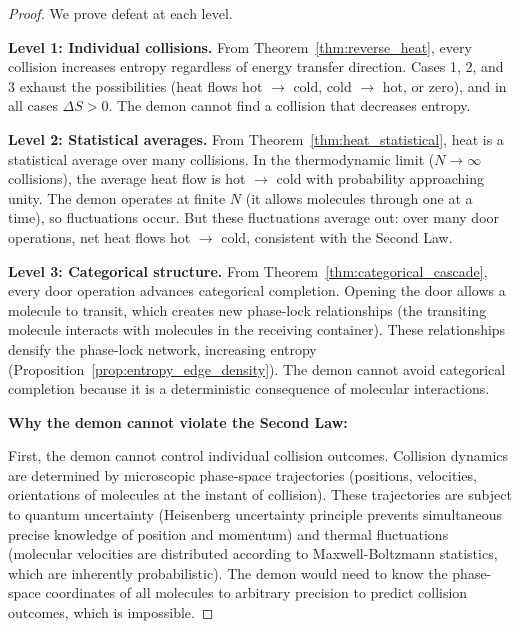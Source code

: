 \documentclass[12pt,a4paper]{article}
\theoremstyle{definition}
\theoremstyle{remark}
\begin{document}
\begin{proof}
We prove defeat at each level.

\textbf{Level 1: Individual collisions.}
From Theorem~\ref{thm:reverse_heat}, every collision increases entropy regardless of energy transfer direction. Cases 1, 2, and 3 exhaust the possibilities (heat flows hot $\to$ cold, cold $\to$ hot, or zero), and in all cases $\Delta S > 0$. The demon cannot find a collision that decreases entropy.

\textbf{Level 2: Statistical averages.}
From Theorem~\ref{thm:heat_statistical}, heat is a statistical average over many collisions. In the thermodynamic limit ($N \to \infty$ collisions), the average heat flow is hot $\to$ cold with probability approaching unity. The demon operates at finite $N$ (it allows molecules through one at a time), so fluctuations occur. But these fluctuations average out: over many door operations, net heat flows hot $\to$ cold, consistent with the Second Law.

\textbf{Level 3: Categorical structure.}
From Theorem~\ref{thm:categorical_cascade}, every door operation advances categorical completion. Opening the door allows a molecule to transit, which creates new phase-lock relationships (the transiting molecule interacts with molecules in the receiving container). These relationships densify the phase-lock network, increasing entropy (Proposition~\ref{prop:entropy_edge_density}). The demon cannot avoid categorical completion because it is a deterministic consequence of molecular interactions.

\textbf{Why the demon cannot violate the Second Law:}

First, the demon cannot control individual collision outcomes. Collision dynamics are determined by microscopic phase-space trajectories (positions, velocities, orientations of molecules at the instant of collision). These trajectories are subject to quantum uncertainty (Heisenberg uncertainty principle prevents simultaneous precise knowledge of position and momentum) and thermal fluctuations (molecular velocities are distributed according to Maxwell-Boltzmann statistics, which are inherently probabilistic). The demon would need to know the phase-space coordinates of all molecules to arbitrary precision to predict collision outcomes, which is impossible.


\end{proof}
\end{document}
